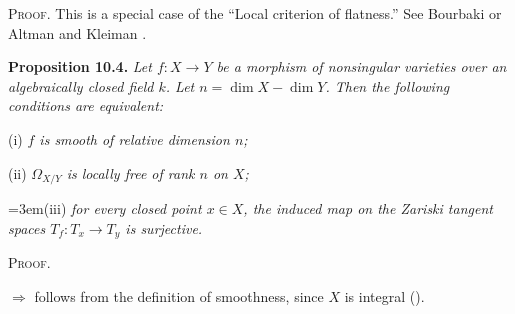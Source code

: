 {\smallskip
\noindent\textsc{Proof.} This is a special case of the \textquotedblleft{}Local criterion of flatness.\textquotedblright{} See Bourbaki  or Altman and Kleiman .

\medskip
\noindent\hypertarget{result-III-10.4}{}\textbf{Proposition 10.4.} \emph{Let $f\colon X\to Y$ be a morphism of nonsingular varieties over an algebraically closed field $k$. Let $n=\dim X-\dim Y$. Then the following conditions are equivalent:}

\noindent\hspace*{1.7em}\hypertarget{result-III-10.4-i}{}(i) \emph{$f$ is smooth of relative dimension $n$;}

\noindent\hspace*{1.7em}\hypertarget{result-III-10.4-ii}{}(ii) \emph{$\Omega_{X/Y}$ is locally free of rank $n$ on $X$;}

\noindent\hangindent=3em\hspace*{1.7em}\hypertarget{result-III-10.4-iii}{}(iii) \emph{for every closed point $x\in X$, the induced map on the Zariski tangent spaces $T_f\colon T_x\to T_y$ is surjective.}

\smallskip
\noindent\textsc{Proof.}

 $\Rightarrow$  follows from the definition of smoothness, since $X$ is integral ().}
